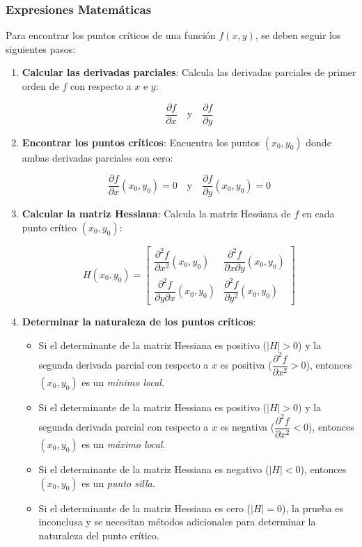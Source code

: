 \subsubsection{Expresiones Matemáticas}

Para encontrar los puntos críticos de una función $f(x,y)$, se deben seguir los siguientes pasos:

\begin{enumerate}
	\item \textbf{Calcular las derivadas parciales}:  Calcula las derivadas parciales de primer orden de $f$ con respecto a $x$ e $y$:
	
	$$\frac{\partial f}{\partial x} \quad \text{y} \quad \frac{\partial f}{\partial y}$$
	
	\item \textbf{Encontrar los puntos críticos}:  Encuentra los puntos $(x_0, y_0)$ donde ambas derivadas parciales son cero:
	
	$$\frac{\partial f}{\partial x}(x_0, y_0) = 0 \quad \text{y} \quad \frac{\partial f}{\partial y}(x_0, y_0) = 0$$
	
	\item \textbf{Calcular la matriz Hessiana}: Calcula la matriz Hessiana de $f$ en cada punto crítico $(x_0, y_0)$:
	
	$$H(x_0, y_0) = \begin{bmatrix} 
		\dfrac{\partial^2 f}{\partial x^2}(x_0, y_0) & \dfrac{\partial^2 f}{\partial x \partial y}(x_0, y_0) \\[3mm]
		\dfrac{\partial^2 f}{\partial y \partial x}(x_0, y_0) & \dfrac{\partial^2 f}{\partial y^2}(x_0, y_0) 
	\end{bmatrix}$$
	
	\item \textbf{Determinar la naturaleza de los puntos críticos}:
	\begin{itemize}
		\item Si el determinante de la matriz Hessiana es positivo ($|H| > 0$) y la segunda derivada parcial con respecto a $x$ es positiva ($\dfrac{\partial^2 f}{\partial x^2} > 0$), entonces $(x_0, y_0)$ es un \textit{mínimo local}.
		
		\item Si el determinante de la matriz Hessiana es positivo ($|H| > 0$) y la segunda derivada parcial con respecto a $x$ es negativa ($\dfrac{\partial^2 f}{\partial x^2} < 0$), entonces $(x_0, y_0)$ es un \textit{máximo local}.
		
		\item Si el determinante de la matriz Hessiana es negativo ($|H| < 0$), entonces $(x_0, y_0)$ es un \textit{punto silla}.
		
		\item Si el determinante de la matriz Hessiana es cero ($|H| = 0$), la prueba es inconclusa y se necesitan métodos adicionales para determinar la naturaleza del punto crítico.
	\end{itemize}
\end{enumerate}

